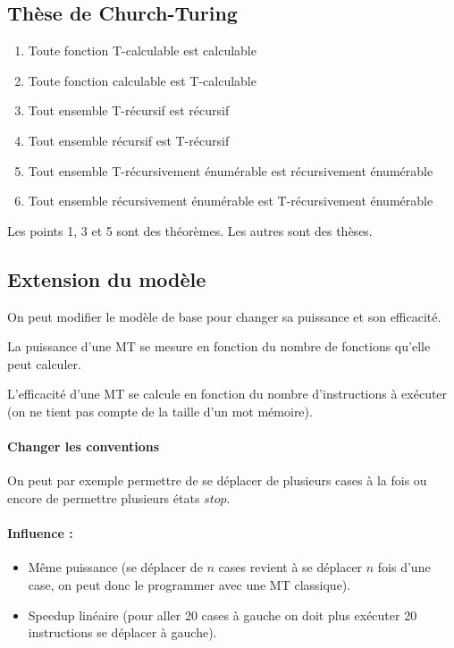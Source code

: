 \subsection{Thèse de Church-Turing}
\begin{enumerate}
	\item Toute fonction T-calculable est calculable
	\item Toute fonction calculable est T-calculable
	\item Tout ensemble T-récursif est récursif
	\item Tout ensemble récursif est T-récursif
	\item Tout ensemble T-récursivement énumérable est récursivement
		énumérable
	\item Tout ensemble récursivement énumérable est T-récursivement
		énumérable
\end{enumerate}
Les points 1, 3 et 5 sont des théorèmes. Les autres sont des thèses.

\subsection{Extension du modèle}
On peut modifier le modèle de base pour changer sa puissance et son efficacité.

\begin{mydef} La puissance d'une MT se mesure en
	fonction du nombre de fonctions qu'elle peut calculer.
\end{mydef}


\begin{mydef} L'efficacité d'une MT se calcule en
	fonction du nombre d'instructions à exécuter (on ne tient pas compte de
	la taille d'un mot mémoire).
\end{mydef}

\paragraph{Changer les conventions}
On peut par exemple permettre de se déplacer de plusieurs cases à la fois ou
encore de permettre plusieurs états $stop$.

\paragraph{Influence :}
\begin{itemize}
	\item Même puissance (se déplacer de $n$ cases revient à se déplacer $n$ fois d'une case, on peut donc le programmer avec une MT classique).
	\item Speedup linéaire (pour aller 20 cases à gauche on doit plus
		exécuter 20 instructions se déplacer à gauche).
\end{itemize}

